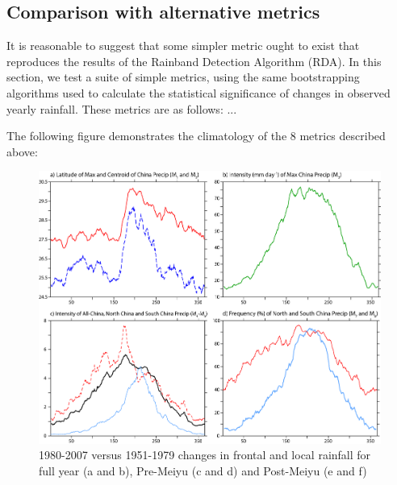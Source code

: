 \subsection{Comparison with alternative metrics}
It is reasonable to suggest that some simpler metric ought to exist that reproduces the results of the Rainband Detection Algorithm (RDA). In this section, we test a suite of simple metrics, using the same bootstrapping algorithms used to calculate the statistical significance of changes in observed yearly rainfall. These metrics are as follows: ...

The following figure demonstrates the climatology of the 8 metrics described above:

\begin{figure}[htb]

\noindent\includegraphics[width=36pc]{Figures/A3_met_climo}
\caption{1980-2007 versus 1951-1979 changes in frontal and local rainfall for full year (a and b), Pre-Meiyu (c and d) and Post-Meiyu (e and f)}
\end{figure}



